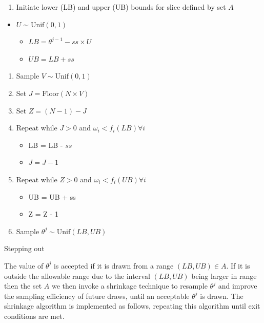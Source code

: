 \documentclass[article]{jss}
\begin{document}
%
\begin{algorithm}[H]
\begin{enumerate}
\item Initiate lower (LB) and upper (UB) bounds for slice defined by set
$A$\end{enumerate}
\begin{itemize}
\item $U\sim\mbox{Unif}(0,1)$ 

\begin{itemize}
\item $LB=\theta^{j-1}-ss{\times}U$ 
\item $UB=LB+ss$ 
\end{itemize}
\end{itemize}
\begin{enumerate}
\item Sample $V\sim\mbox{Unif}(0,1)$ 
\item Set $J=\mbox{Floor}(N{\times}V)$ 
\item Set $Z=(N-1)-J$ 
\item Repeat while $J>0$ and $\omega_{i}<f_{i}(LB)\forall i$

\begin{itemize}
\item LB = LB - $ss$ 
\item $J=J-1$ 
\end{itemize}
\item Repeat while $Z>0$ and $\omega_{i}<f_{i}(UB)\forall i$

\begin{itemize}
\item UB = UB + ss 
\item Z = Z - 1 
\end{itemize}
\item Sample $\theta^{j}\sim\mbox{Unif}(LB,UB)$ 
\end{enumerate}
\caption{Stepping out}
\label{alg:steppingout}
\end{algorithm}


The value of $\theta^{j}$ is accepted if it is drawn from a range
$(LB,UB)\in A$. If it is outside the allowable range due to the
interval $(LB,UB)$ being larger in range then the set $A$ we then
invoke a shrinkage technique to resample $\theta^{j}$ and improve the
sampling efficiency of future draws, until an acceptable $\theta^{j}$
is drawn.  The shrinkage algorithm is implemented as follows,
repeating this algorithm until exit conditions are met.
\end{document}
